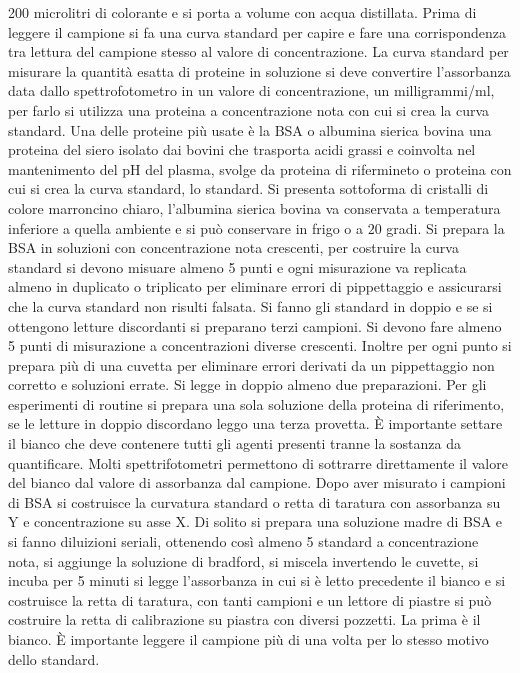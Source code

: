200 microlitri di colorante e si porta a volume con acqua distillata. Prima di leggere il campione si fa una curva standard per capire e fare una corrispondenza tra lettura del campione
stesso al valore di concentrazione. La curva standard per misurare la quantit\`a esatta di proteine in soluzione si deve  convertire l'assorbanza data dallo spettrofotometro in un 
valore di concentrazione, un milligrammi/ml, per farlo si utilizza una proteina a concentrazione nota con cui si crea la curva standard. Una delle proteine pi\`u usate \`e la BSA o 
albumina sierica bovina una proteina del siero isolato dai bovini che trasporta acidi grassi e coinvolta nel mantenimento del pH del plasma, svolge da proteina di rifermineto o 
proteina con cui si crea la curva standard, lo standard. Si presenta sottoforma di cristalli di colore marroncino chiaro, l'albumina sierica bovina va conservata a temperatura inferiore
a quella ambiente e si pu\`o conservare in frigo o a $20$ gradi. Si prepara la BSA in soluzioni con concentrazione nota crescenti, per costruire la curva standard si devono misuare 
almeno 5 punti e ogni misurazione va replicata almeno in duplicato o triplicato per eliminare errori di pippettaggio e assicurarsi che la curva standard non risulti falsata. Si fanno
gli standard in doppio e se si ottengono letture discordanti si preparano terzi campioni. Si devono fare almeno 5 punti di misurazione a concentrazioni diverse crescenti. Inoltre per
ogni punto si prepara pi\`u di una cuvetta per eliminare errori derivati da un pippettaggio non corretto e soluzioni errate. Si legge in doppio almeno due preparazioni. Per gli 
esperimenti di routine si prepara una sola soluzione della proteina di riferimento, se le letture in doppio discordano leggo una terza provetta. \`E importante settare il bianco che
deve contenere tutti gli agenti presenti tranne la sostanza da quantificare. Molti spettrifotometri permettono di sottrarre direttamente il valore del bianco dal valore di assorbanza 
dal campione. Dopo aver misurato i campioni di BSA si costruisce la curvatura standard o retta di taratura con assorbanza su Y e concentrazione su asse X. Di solito si prepara una
soluzione madre di BSA e si fanno diluizioni seriali, ottenendo cos\`i almeno 5 standard a concentrazione nota, si aggiunge la soluzione di bradford, si miscela invertendo le cuvette, 
si incuba per 5 minuti si legge l'assorbanza in cui si \`e letto precedente il bianco e si costruisce la retta di taratura, con tanti campioni e un lettore di piastre si pu\`o costruire
la retta di calibrazione su piastra con diversi pozzetti. La prima \`e il bianco. \`E importante leggere il campione pi\`u di una volta per lo stesso motivo dello standard. 
